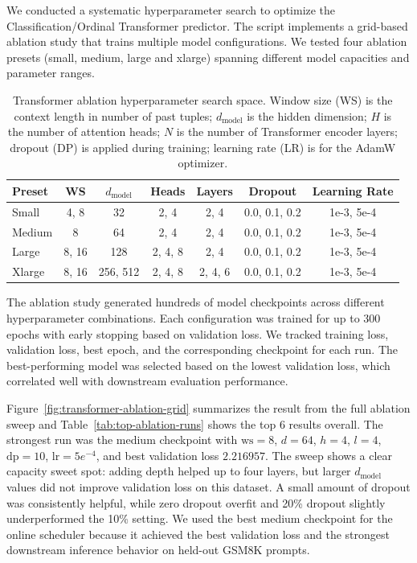 \documentclass[11pt]{article}
\begin{document}
We conducted a systematic hyperparameter search to optimize the Classiﬁcation/Ordinal Transformer predictor. The script implements a grid-based ablation study that trains multiple model configurations. We tested four ablation presets (small, medium, large and xlarge) spanning different model capacities and parameter ranges.

\begin{table}[t!]
  \centering
  \caption{Transformer ablation hyperparameter search space. Window size (WS) is the context length in number of past tuples; $d_{\text{model}}$ is the hidden dimension; $H$ is the number of attention heads; $N$ is the number of Transformer encoder layers; dropout (DP) is applied during training; learning rate (LR) is for the AdamW optimizer.}
  \label{tab:ablation-params}
  \footnotesize
  \begin{tabular}{@{}lcccccc@{}}
    \toprule
    Preset & WS & $d_{\text{model}}$ & Heads & Layers & Dropout & Learning Rate \\
    \midrule
    Small & 4, 8 & 32 & 2, 4 & 2, 4 & 0.0, 0.1, 0.2 & 1e-3, 5e-4 \\
    Medium & 8 & 64 & 2, 4 & 2, 4 & 0.0, 0.1, 0.2 & 1e-3, 5e-4 \\
    Large & 8, 16 & 128 & 2, 4, 8 & 2, 4 & 0.0, 0.1, 0.2 & 1e-3, 5e-4 \\
    Xlarge & 8, 16 & 256, 512 & 2, 4, 8 & 2, 4, 6 & 0.0, 0.1, 0.2 & 1e-3, 5e-4 \\
    \bottomrule
  \end{tabular}
\end{table}

The ablation study generated hundreds of model checkpoints across different hyperparameter combinations. Each configuration was trained for up to 300 epochs with early stopping based on validation loss. We tracked training loss, validation loss, best epoch, and the corresponding checkpoint for each run. The best-performing model was selected based on the lowest validation loss, which correlated well with downstream evaluation performance.

Figure~\ref{fig:transformer-ablation-grid} summarizes the result from the full ablation sweep and Table~\ref{tab:top-ablation-runs} shows the top 6 results overall. The strongest run was the medium checkpoint with \(\text{ws}=8\), \(d=64\), \(h=4\), \(l=4\), \(\text{dp}=10\), \(\text{lr}=5e^{-4}\), and best validation loss \(2.216957\). The sweep shows a clear capacity sweet spot: adding depth helped up to four layers, but larger \(d_{\text{model}}\) values did not improve validation loss on this dataset. A small amount of dropout was consistently helpful, while zero dropout overfit and 20\% dropout slightly underperformed the 10\% setting. We used the best medium checkpoint for the online scheduler because it achieved the best validation loss and the strongest downstream inference behavior on held-out GSM8K prompts.
\end{document}

